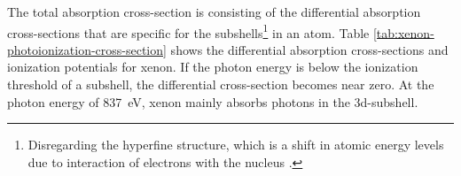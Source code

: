 The total absorption cross-section is consisting of the differential absorption cross-sections that are specific for the subshells\footnote{Disregarding the hyperfine structure, which is a shift in atomic energy levels due to interaction of electrons with the nucleus \citep{Demtroder-2005-Springer}.} in an atom. Table \ref{tab:xenon-photoionization-cross-section} shows the differential absorption cross-sections and ionization potentials for xenon. If the photon energy is below the ionization threshold of a subshell, the differential cross-section becomes near zero. At the photon energy of \SI{837}{\electronvolt}, xenon mainly absorbs photons in the 3d-subshell.
